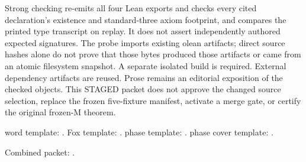 Strong checking re-emits all four Lean exports and checks every cited declaration's existence and standard-three axiom footprint, and compares the printed type transcript on replay. It does not assert independently authored expected signatures. The probe imports existing olean artifacts; direct source hashes alone do not prove that those bytes produced those artifacts or came from an atomic filesystem snapshot. A separate isolated build is required. External dependency artifacts are reused. Prose remains an editorial exposition of the checked objects. This STAGED packet does not approve the changed source selection, replace the frozen five-fixture manifest, activate a merge gate, or certify the original frozen-M theorem.

word template: .
Fox template: .
phase template: .
phase cover template: .
\par Combined packet: .
